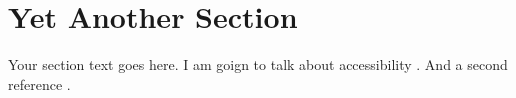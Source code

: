 \section{Yet Another Section}

Your section text goes here. I am goign to talk about accessibility \cite{jones1981accessibility}. And a second reference \cite{10.1145/1090785.1090831}.